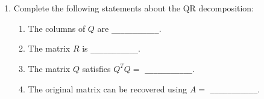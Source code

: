 \documentclass{ximera}
\begin{document}
\begin{exercise}
\begin{enumerate}
\begin{verbatim}
        R[i,j] = ______________(Q[:,i], A[:,j])

        # Step 4: Subtract the ___________ component
        v = v - R[i,j] * Q[:,i]

    # Step 5: Compute the _________ of the updated vector
    R[j,j] = ________(v)

    # Step 6: Perform ___________
    Q[:,j] = v / R[j,j]

# Step 7: Return the decomposition
Return Q, R
\end{verbatim}


\item Complete the following statements about the QR decomposition:

\begin{enumerate}
    \item The columns of $Q$ are \verb|___________|.
    \item The matrix $R$ is \verb|___________|.
    \item The matrix $Q$ satisfies $Q^TQ = $ \verb|___________|.
    \item The original matrix can be recovered using $A = $ \verb|___________|.
\end{enumerate}
\end{enumerate}

\end{exercise}
\end{document}
